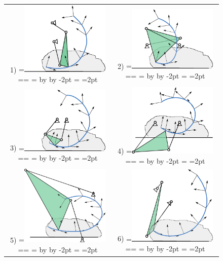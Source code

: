 \documentclass[twocolumn,10pt]{asme2ej}
\makeatletter
\newcommand{\putindeepbox}[2][0.7\baselineskip]{{%
    \setbox0=\hbox{#2}%
    \setbox0=\vbox{\noindent\hsize=\wd0\unhbox0}
    \@tempdima=\dp0
    \advance\@tempdima by \ht0
    \advance\@tempdima by -#1\relax
    \dp0=\@tempdima
    \ht0=#1\relax
    \box0
}}
\makeatother
\begin{document}
\begin{figure}
\begin{tabular}{cc}
  1)\putindeepbox[2pt]{\includegraphics[width=120pt]{figure/sol1.eps}}
    & 2)\putindeepbox[2pt]{\includegraphics[width=120pt]{figure/sol2.eps}} \\
  3)\putindeepbox[2pt]{\includegraphics[width=120pt]{figure/sol3.eps}}
    & 4)\putindeepbox[2pt]{\includegraphics[width=120pt]{figure/sol4.eps}}\\
  5)\putindeepbox[2pt]{\includegraphics[width=120pt]{figure/sol6.eps}}
    & 6)\putindeepbox[2pt]{\includegraphics[width=120pt]{figure/sol7.eps}} \\

\end{tabular}
\end{figure}
\end{document}
